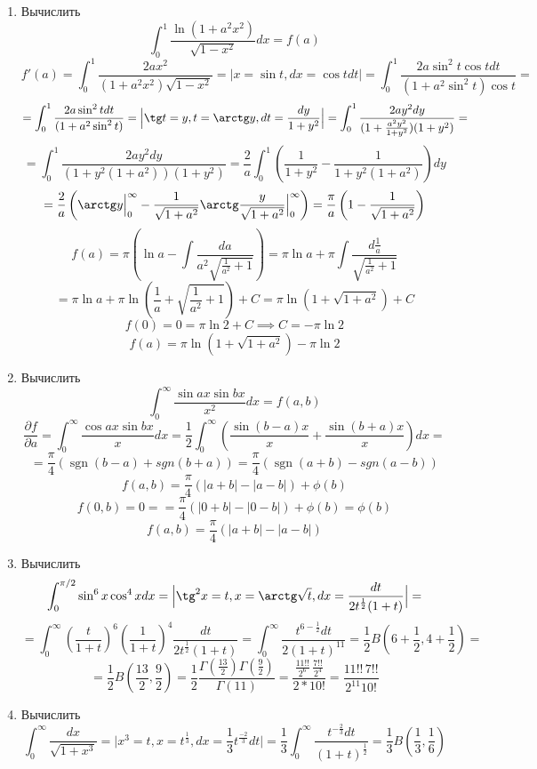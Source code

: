 \documentclass{article}
\DeclareMathOperator{\sgn}{sgn}
\begin{document}
\begin{large}
\begin{enumerate}
\item Вычислить
$$ \int_0^1 \frac{\ln(1+a^2x^2)}{\sqrt{1-x^2}} dx = f(a) $$
$$ f'(a) = \int_0^1 \frac{2ax^2}{(1+a^2x^2)\sqrt{1-x^2}} = \Big| x = \sin t, dx =\cos t dt \Big| = \int_0^1 \frac{2a\sin^2 t \cos t dt}{(1+a^2\sin^2 t)\cos t} = $$
$$ = \int_0^1 \frac{2a \sin^2 t dt}{(1+a^2\sin^2 t)} = \Big| \tg t = y, t = \arctg y, dt = \frac{dy}{1+y^2} \Big| = \int_0^1 \frac{2a y^2 dy}{(1+\frac{a^2y^2}{1+y^2})(1+y^2)} = $$
$$ = \int_0^1 \frac{2a y^2 dy}{(1+y^2(1+a^2))(1+y^2)} = \frac{2}{a} \int_0^1 \left( \frac{1}{1+y^2} - \frac{1}{1+y^2(1+a^2)} \right)dy $$
$$ = \frac{2}{a} \left( \arctg y \Big|_0^\infty - \frac{1}{\sqrt{1+a^2}} \arctg \frac{y}{\sqrt{1+a^2}} \Big|_0^\infty \right) = \frac{\pi}{a} \left(1 - \frac{1}{\sqrt{1+a^2}} \right) $$
$$ f(a) = \pi \left( \ln a - \int \frac{da}{a^2\sqrt{\frac{1}{a^2}+1}} \right) = \pi\ln a + \pi \int \frac{d\frac{1}{a}}{\sqrt{\frac{1}{a^2}+1}} $$
$$ = \pi \ln a + \pi \ln \left( \frac{1}{a} + \sqrt{\frac{1}{a^2} + 1} \right) + C = \pi\ln\left(1 + \sqrt{1+a^2} \right) + C $$
$$ f(0) = 0 = \pi\ln2 + C \implies C = -\pi\ln2 $$
$$ f(a) = \pi\ln\left(1 + \sqrt{1+a^2} \right) - \pi\ln2$$

\item Вычислить
$$ \int_0^\infty \frac{\sin ax \sin bx}{x^2}dx = f(a,b) $$
$$ \frac{\partial f}{\partial a} = \int_0^\infty \frac{\cos ax \sin bx}{x} dx = \frac{1}{2} \int_0^\infty \left( \frac{\sin (b-a)x}{x} + \frac{\sin (b+a)x}{x} \right)dx = $$
$$ = \frac{\pi}{4} (\sgn(b-a) + sgn(b+a)) = \frac{\pi}{4} (\sgn(a+b) - sgn(a-b)) $$
$$ f(a,b) = \frac{\pi}{4} (|a+b| - |a-b|) + \phi(b) $$
$$ f(0,b) = 0 == \frac{\pi}{4} (|0+b| - |0-b|) + \phi(b) = \phi(b) $$
$$ f(a,b) = \frac{\pi}{4} (|a+b| - |a-b|) $$

\item Вычислить
$$ \int_0^{\pi/2} \sin^6 x \cos^4 x dx = \Big| \tg^2 x = t, x = \arctg \sqrt{t}, dx = \frac{dt}{2t^\frac{1}{2}(1+t)} \Big| = $$
$$ = \int_0^\infty \left(\frac{t}{1+t}\right)^6 \left(\frac{1}{1+t}\right)^4 \frac{dt}{2t^\frac{1}{2}(1+t)} = \int_0^\infty \frac{t^{6-\frac{1}{2}}dt}{2(1+t)^{11}} = \frac{1}{2} B\left(6+\frac{1}{2}, 4+\frac{1}{2}\right) = $$
$$ = \frac{1}{2} B\left(\frac{13}{2}, \frac{9}{2}\right) = \frac{1}{2} \frac{\Gamma(\frac{13}{2})\Gamma(\frac{9}{2})}{\Gamma(11)} = \frac{\frac{11!!}{2^6} \, \frac{7!!}{2^4}}{2 * 10!} = \frac{11!! \, 7!!}{2^{11} 10!} $$

\item Вычислить
$$ \int_0^\infty \frac{dx}{\sqrt{1+x^3}} = \Big| x^3 = t, x = t^\frac{1}{3}, dx = \frac{1}{3} t^\frac{-2}{3} dt \Big| = \frac{1}{3} \int_0^\infty \frac{t^{-\frac{2}{3}}dt}{(1+t)^\frac{1}{2}} = \frac{1}{3} B\left(\frac{1}{3}, \frac{1}{6} \right)$$

\end{enumerate}
\end{large}
\end{document}
